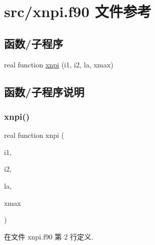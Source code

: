 \hypertarget{xnpi_8f90}{}\section{src/xnpi.f90 文件参考}
\label{xnpi_8f90}
\subsection*{函数/子程序}
\begin{DoxyCompactItemize}
\item 
real function \mbox{\hyperlink{xnpi_8f90_a75e45f790bab9043a104f81ae7d8e960}{xnpi}} (i1, i2, la, xmax)
\end{DoxyCompactItemize}


\subsection{函数/子程序说明}
\mbox{\label{xnpi_8f90_a75e45f790bab9043a104f81ae7d8e960}} 
\subsubsection{\texorpdfstring{xnpi()}{xnpi()}}
{\footnotesize\ttfamily real function xnpi (\begin{DoxyParamCaption}\item[{}]{i1,  }\item[{}]{i2,  }\item[{}]{la,  }\item[{}]{xmax }\end{DoxyParamCaption})}



在文件 xnpi.\+f90 第 2 行定义.

